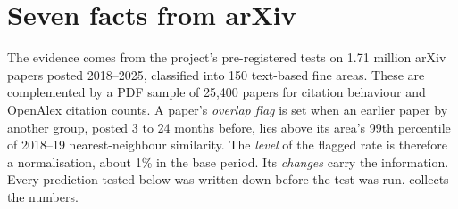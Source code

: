 \section{Seven facts from arXiv}\label{sec:facts}

The evidence comes from the project's pre-registered tests on 1.71 million
arXiv papers posted 2018--2025, classified into 150 text-based fine areas.
These are complemented by a PDF sample of 25,400 papers for citation behaviour and OpenAlex
citation counts. A paper's \emph{overlap flag} is set when an earlier paper by
another group, posted 3 to 24 months before, lies above its area's 99th
percentile of 2018--19 nearest-neighbour similarity. The \emph{level} of the
flagged rate is therefore a normalisation, about 1\% in the base period. Its
\emph{changes} carry the information. Every prediction tested below was written
down before the test was run.  collects the numbers.

